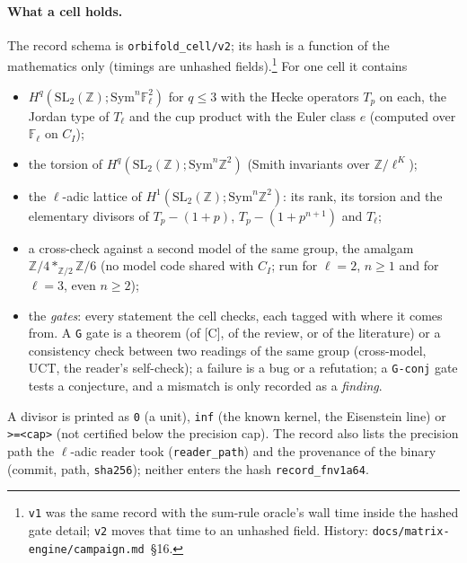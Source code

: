 \documentclass[11pt,openany]{report}
\newcommand{\F}{\mathbb{F}}
\newcommand{\Z}{\mathbb{Z}}
\newcommand{\Sym}{\mathrm{Sym}}
\newcommand{\SL}{\mathrm{SL}}
\newcommand{\file}[1]{\nolinkurl{#1}}
\begin{document}
\paragraph{What a cell holds.} The record schema is \texttt{orbifold\_cell/v2}; its hash is a function of the mathematics
only (timings are unhashed fields).\footnote{\texttt{v1} was the same record with the sum-rule oracle's wall time inside the
hashed gate detail; \texttt{v2} moves that time to an unhashed field. History:
\file{docs/matrix-engine/campaign.md}~\S16.} For one cell it contains
\begin{itemize}[nosep]
\item $H^q(\SL_2(\Z);\Sym^n\F_\ell^2)$ for $q\le3$ with the Hecke operators $T_p$ on each, the Jordan type of $T_\ell$
  and the cup product with the Euler class $e$ (computed over $\F_\ell$ on $C_I$);
\item the torsion of $H^q(\SL_2(\Z);\Sym^n\Z^2)$ (Smith invariants over $\Z/\ell^K$);
\item the $\ell$-adic lattice of $H^1(\SL_2(\Z);\Sym^n\Z^2)$: its rank, its torsion and the elementary divisors of
  $T_p-(1+p)$, $T_p-(1+p^{n+1})$ and $T_\ell$;
\item a cross-check against a second model of the same group, the amalgam $\Z/4*_{\Z/2}\Z/6$ (no model code shared with $C_I$; run for $\ell=2$, $n\ge1$ and for $\ell=3$, even $n\ge2$);
\item the \emph{gates}: every statement the cell checks, each tagged with where it comes from. A \texttt{G} gate is a
  theorem (of [C], of the review, or of the literature) or a consistency check between two readings of the same group
  (cross-model, UCT, the reader's self-check); a failure is a bug or a refutation; a \texttt{G-conj}
  gate tests a conjecture, and a mismatch is only recorded as a \emph{finding}.
\end{itemize}
A divisor is printed as \texttt{0} (a unit), \texttt{inf} (the known kernel, the Eisenstein line) or \texttt{>=<cap>}
(not certified below the precision cap). The record also lists the precision path the $\ell$-adic reader took
(\texttt{reader\_path}) and the provenance of the binary (commit, path, \texttt{sha256}); neither enters the
hash \texttt{record\_fnv1a64}.
\end{document}
